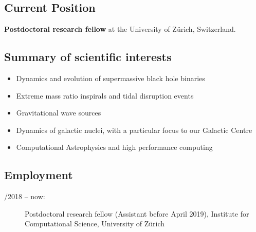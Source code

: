 
\subsection*{Current Position}

{\bf Postdoctoral research fellow} at the University of Z\"urich, Switzerland. 

\subsection*{Summary of scientific interests}
\begin{itemize}
\item Dynamics and evolution of supermassive black hole binaries 
\item Extreme mass ratio inspirals and tidal disruption events
\item Gravitational wave sources
\item Dynamics of galactic nuclei, with a particular focus to our Galactic Centre \item Computational Astrophysics and high performance computing
\end{itemize}

\subsection*{Employment}
\begin{description}
  \item[/2018 -- now:] Postdoctoral research fellow (Assistant before April 2019), Institute for Computational Science,  University of Z\"urich 
\end{description}

